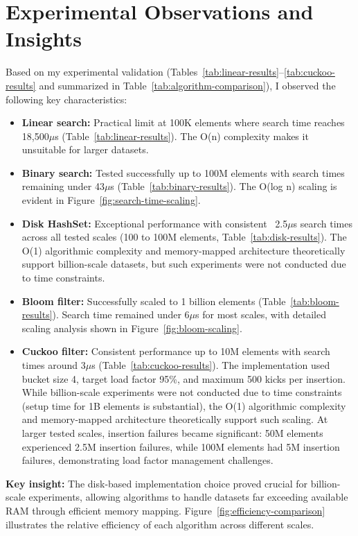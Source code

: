 \documentclass[sigconf]{acmart}
\begin{document}
\section{Experimental Observations and Insights}
Based on my experimental validation (Tables~\ref{tab:linear-results}--\ref{tab:cuckoo-results} and summarized in Table~\ref{tab:algorithm-comparison}), I observed the following key characteristics:
\begin{itemize}
\item \textbf{Linear search:} Practical limit at 100K elements where search time reaches 18,500$\mu$s (Table~\ref{tab:linear-results}). The O(n) complexity makes it unsuitable for larger datasets.
\item \textbf{Binary search:} Tested successfully up to 100M elements with search times remaining under 43$\mu$s (Table~\ref{tab:binary-results}). The O(log n) scaling is evident in Figure~\ref{fig:search-time-scaling}.
\item \textbf{Disk HashSet:} Exceptional performance with consistent ~2.5$\mu$s search times across all tested scales (100 to 100M elements, Table~\ref{tab:disk-results}). The O(1) algorithmic complexity and memory-mapped architecture theoretically support billion-scale datasets, but such experiments were not conducted due to time constraints.
\item \textbf{Bloom filter:} Successfully scaled to 1 billion elements (Table~\ref{tab:bloom-results}). Search time remained under 6$\mu$s for most scales, with detailed scaling analysis shown in Figure~\ref{fig:bloom-scaling}.
\item \textbf{Cuckoo filter:} Consistent performance up to 10M elements with search times around 3$\mu$s (Table~\ref{tab:cuckoo-results}). The implementation used bucket size 4, target load factor 95\%, and maximum 500 kicks per insertion. While billion-scale experiments were not conducted due to time constraints (setup time for 1B elements is substantial), the O(1) algorithmic complexity and memory-mapped architecture theoretically support such scaling. At larger tested scales, insertion failures became significant: 50M elements experienced 2.5M insertion failures, while 100M elements had 5M insertion failures, demonstrating load factor management challenges.
\end{itemize}
\textbf{Key insight:} The disk-based implementation choice proved crucial for billion-scale experiments, allowing algorithms to handle datasets far exceeding available RAM through efficient memory mapping. Figure~\ref{fig:efficiency-comparison} illustrates the relative efficiency of each algorithm across different scales.
\end{document}
